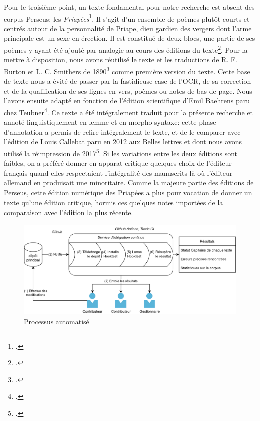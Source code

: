 Pour le troisième point, un texte fondamental pour notre recherche est absent des corpus Perseus: les \textit{Priapées}\footcite{Clerice_Digital_edition_of_2020}. Il s'agit d'un ensemble de poèmes plutôt courts et centrés autour de la personnalité de Priape, dieu gardien des vergers dont l'arme principale est un sexe en érection. Il est constitué de deux blocs, une partie de ses poèmes y ayant été ajouté par analogie au cours des éditions du texte\footcite{callebat_les_2008}. Pour la mettre à disposition, nous avons réutilisé le texte et les traductions de R. F. Burton et L. C. Smithers de 1890\footcite{burton_priapeia_1890} comme première version du texte. Cette base de texte nous a évité de passer par la fastidieuse case de l'OCR, de sa correction et de la qualification de ses lignes en vers, poèmes ou notes de bas de page. Nous l'avons ensuite adapté en fonction de l'édition scientifique d'Emil Baehrens paru chez Teubner\footcite{baehrens_poetae_1910}. Ce texte a été intégralement traduit pour la présente recherche et annoté linguistiquement en lemme et en morpho-syntaxe: cette phase d'annotation a permis de relire intégralement le texte, et de le comparer avec l'édition de Louis Callebat paru en 2012 aux Belles lettres et dont nous avons utilisé la réimpression de 2017\footcite{callebat_priapees_2012}. Si les variations entre les deux éditions sont faibles, on a préféré donner en apparat critique quelques choix de l'éditeur français quand elles respectaient l'intégralité des manuscrits là où l'éditeur allemand en produisait une minoritaire. Comme la majeure partie des éditions de Perseus, cette édition numérique des Priapées a plus pour vocation de donner un texte qu'une édition critique, hormis ces quelques notes importées de la comparaison avec l'édition la plus récente.

\begin{figure}
    \centering
    \includegraphics[width=\linewidth]{figures/chap1/part2/hooktest.png}
    \caption{Processus automatisé}
    \label{fig:chap1:ci}
\end{figure}

